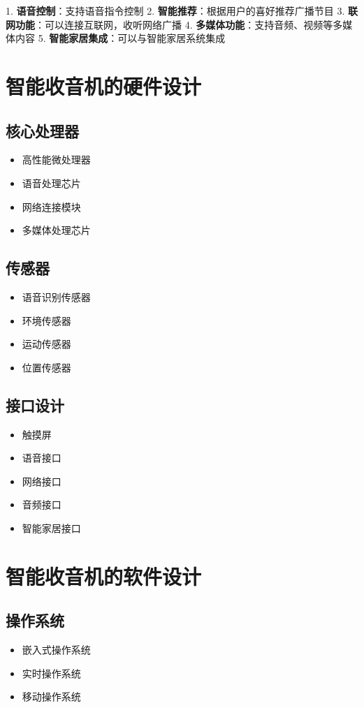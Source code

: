 \documentclass[12pt,UTF8]{ctexbook}
\begin{document}
1. \textbf{语音控制}：支持语音指令控制
2. \textbf{智能推荐}：根据用户的喜好推荐广播节目
3. \textbf{联网功能}：可以连接互联网，收听网络广播
4. \textbf{多媒体功能}：支持音频、视频等多媒体内容
5. \textbf{智能家居集成}：可以与智能家居系统集成

\section{智能收音机的硬件设计}

\subsection{核心处理器}\begin{itemize}
  \item 高性能微处理器
  \item 语音处理芯片
  \item 网络连接模块
  \item 多媒体处理芯片\end{itemize}

\subsection{传感器}\begin{itemize}
  \item 语音识别传感器
  \item 环境传感器
  \item 运动传感器
  \item 位置传感器\end{itemize}

\subsection{接口设计}\begin{itemize}
  \item 触摸屏
  \item 语音接口
  \item 网络接口
  \item 音频接口
  \item 智能家居接口\end{itemize}

\section{智能收音机的软件设计}

\subsection{操作系统}\begin{itemize}
  \item 嵌入式操作系统
  \item 实时操作系统
  \item 移动操作系统\end{itemize}
\end{document}
